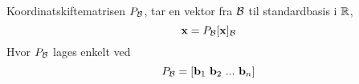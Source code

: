 Koordinatskiftematrisen $P_{\mathcal{B}}$,
tar en vektor fra $\mathcal{B}$ til standardbasis i $\mathbb{R}$,
$$\mathbf{x} = P_{\mathcal{B}} [\mathbf{x}]_{\mathcal{B}}$$
Hvor $P_{\mathcal{B}}$ lages enkelt ved
$$P_\B = [\vecb_1\ \vecb_2\ ...\ \vecb_n]$$
